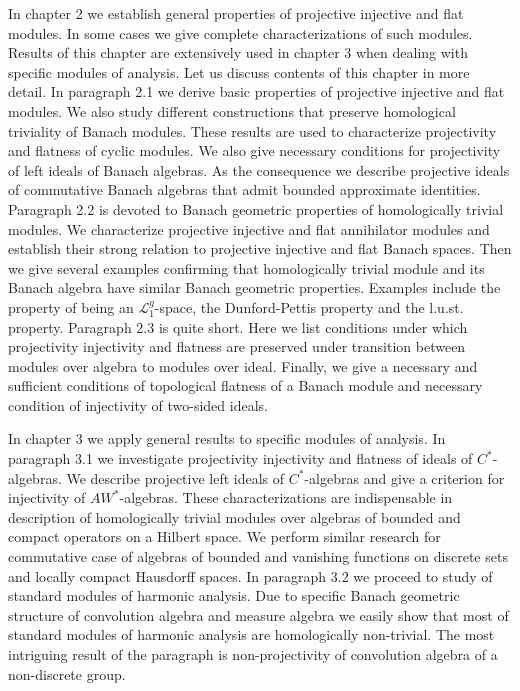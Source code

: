 \documentclass[11pt, a4paper, oneside]{thbook}
\begin{document}
In chapter 2 we establish general properties of projective injective and flat
modules. In some cases we give complete characterizations of such modules.
Results of this chapter are extensively used in chapter 3 when dealing with
specific modules of analysis. Let us discuss contents of this chapter in more
detail. In paragraph 2.1 we derive basic properties of projective injective and
flat modules. We also study different
constructions that preserve homological triviality of Banach modules. These
results are used to characterize projectivity and flatness of cyclic modules. We
also give necessary conditions for projectivity of left ideals of Banach
algebras. As the consequence we describe projective ideals of commutative Banach
algebras that admit bounded approximate identities. Paragraph 2.2 is devoted to
Banach geometric properties of homologically trivial modules. We characterize
projective injective and flat annihilator modules and establish their strong
relation to projective injective and flat Banach spaces. Then we give several
examples confirming that homologically trivial module and its Banach algebra
have similar Banach geometric properties. Examples include the property of being
an $\mathscr{L}_1^g$-space, the Dunford-Pettis property and the l.u.st.
property. Paragraph 2.3 is quite short. Here we list conditions under which
projectivity injectivity and flatness are preserved under transition between
modules over algebra to modules over ideal. Finally, we give a necessary and
sufficient conditions of topological flatness of a Banach module and necessary
condition of injectivity of two-sided ideals.

In chapter 3 we apply general results to specific modules of analysis. In
paragraph 3.1 we investigate projectivity injectivity and flatness of ideals of
$C^*$-algebras. We describe projective left ideals of $C^*$-algebras and give a
criterion for injectivity of $AW^*$-algebras. These characterizations are
indispensable in description of homologically trivial modules over algebras of
bounded and compact operators on a Hilbert space. We perform similar research
for commutative case of algebras of bounded and vanishing functions on discrete
sets and locally compact Hausdorff spaces. In paragraph 3.2 we proceed to study
of standard modules of harmonic analysis. Due to specific Banach geometric
structure of convolution algebra and measure algebra we easily show that most of
standard modules of harmonic analysis are homologically non-trivial. The most
intriguing result of the paragraph is non-projectivity of convolution algebra of
a non-discrete group. 
\end{document}
